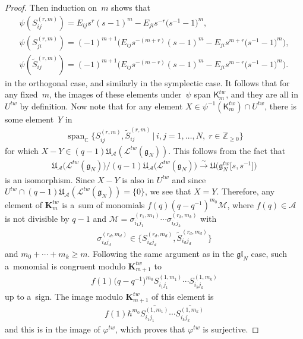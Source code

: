 \begin{proof}
Then induction on~$m$ shows that
\begin{gather*}
\psi(S_{ij}^{(r,m)})=E_{ij}s^r(s-1)^m - E_{ji}s^{-r}\big(s^{-1}-1\big)^m,\\
\psi(S_{ji}^{(r,m)})=(-1)^{m+1}\big(E_{ij}s^{-(m+r)}(s-1)^m - E_{ji}s^{m+r}\big(s^{-1}-1\big)^m\big),\\
\psi(\widetilde{S}_{ij}^{(r,m)})=(-1)^{m+1}\big(E_{ij}s^{-(m-r)}(s-1)^m - E_{ji}s^{m-r}\big(s^{-1}-1\big)^m\big).
\end{gather*}
in the orthogonal case, and similarly in the symplectic case.
It follows that for any f\/ixed~$m$, the images of these elements under~$\psi$ span $\mathsf{K}_m^{tw}$, and they are all
in $U^{tw}$ by def\/inition.
Now note that for any element $X \in \psi^{-1}(\mathsf{K}_m^{tw}) \cap U^{tw}$, there is some element~$Y$ in
 \begin{gather*}
 \operatorname{span}_{\mathbb{C}} \big\{S_{ij}^{(r,m)},\widetilde{S}_{ij}^{(r,m)} \,|\, i,j=1,\ldots,N,\; r \in \mathbb{Z}_{\ge 0}\big\}
 \end{gather*}
for which $X-Y \in (q-1)\mathfrak{U}_{\mathcal{A}}(\mathcal{L}^{tw}(\mathfrak{g}_N))$.
This follows from the fact that
\begin{gather*}
\mathfrak{U}_{\mathcal{A}}\big(\mathcal{L}^{tw}(\mathfrak{g}_N)\big)/(q-1)\mathfrak{U}_{\mathcal{A}}\big(\mathcal{L}^{tw}(\mathfrak{g}_N)\big)
\stackrel{\sim}{\longrightarrow} \mathfrak{U}\big(\mathfrak{g}_N^{tw}\big[s,s^{-1}\big]\big)
\end{gather*}
is an isomorphism.
Since $X-Y$ is also in $U^{tw}$ and since $U^{tw} \cap
(q-1)\mathfrak{U}_{\mathcal{A}}(\mathcal{L}^{tw}(\mathfrak{g}_N))=\{0\}$, we see that $X=Y$.
Therefore, any element of $\mathbf{K}_m^{tw}$ is a~sum of monomials $f(q)(q-q^{-1})^{m_0}\mathcal{M}$, where $f(q) \in
\mathcal{A}$ is not divisible by $q-1$ and $\mathcal{M}=\sigma_{i_1 j_1}^{(r_1,m_1)} \cdots \sigma_{i_k j_k}^{(r_k,m_k)}$ with
\begin{gather*}
\sigma_{i_d j_d}^{(r_d,m_d)} \in \big\{S_{i_d j_d}^{(r_d,m_d)},\widetilde{S}_{i_d j_d}^{(r_d,m_d)}\big\}
\end{gather*}
and $m_0+\cdots+m_k \geq m$.
Following the same argument as in the $\mathfrak{gl}_N$ case, such a~monomial is congruent modulo
$\mathbf{K}_{m+1}^{tw}$ to
\begin{gather*}
f(1)\big(q-q^{-1}\big)^{m_0}S_{i_1 j_1}^{(1,m_1)} \cdots S_{i_k j_k}^{(1,m_k)}
\end{gather*}
up to a~sign.
The image modulo $\mathbf{K}_{m+1}^{tw}$ of this element is
\begin{gather*}
f(1)\hbar^{m_0}\overline{S_{i_1 j_1}^{(1,m_1)}} \cdots \overline{S_{i_k j_k}^{(1,m_k)}}
\end{gather*}
and this is in the image of $\varphi^{tw}$, which proves that $\varphi^{tw}$ is surjective.
\end{proof}
